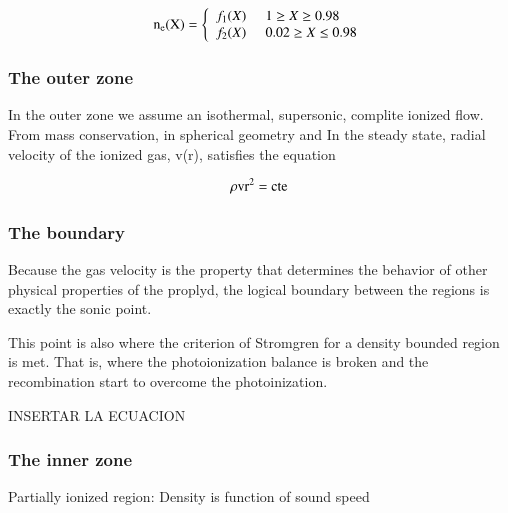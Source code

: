 \documentclass{article}
\begin{document}
\begin{equation}
  \rm n_e(X) = \left\lbrace
    \begin{array}{l}
      f_1(X) \;\;\;\;\; 1 \ge X \ge 0.98 \\
      f_2(X) \;\;\;\;\;  0.02 \ge X \le 0.98  \\
    \end{array}
  \right.
\end{equation}

\subsubsection{The outer zone}
\label{sec:outer}

In the outer zone we assume an isothermal, supersonic, complite ionized flow. From mass conservation, in spherical geometry and In the steady state, radial velocity of the ionized gas, v(r),
satisfies the equation


\begin{equation}
  \rm \rho v r^2 = cte
\end{equation}

\subsubsection{The boundary}
\label{sec:boundary}

Because the gas velocity is the property that determines the behavior
of other physical properties of the proplyd, the logical boundary
between the regions is exactly the sonic point.

This point is also where the criterion of Stromgren for a density
bounded region is met. That is, where the photoionization balance is
broken and the recombination start to overcome the photoinization.

INSERTAR LA ECUACION

\subsubsection{The inner zone}
\label{sec:inner}

Partially ionized region: Density is function of sound speed
\end{document}
